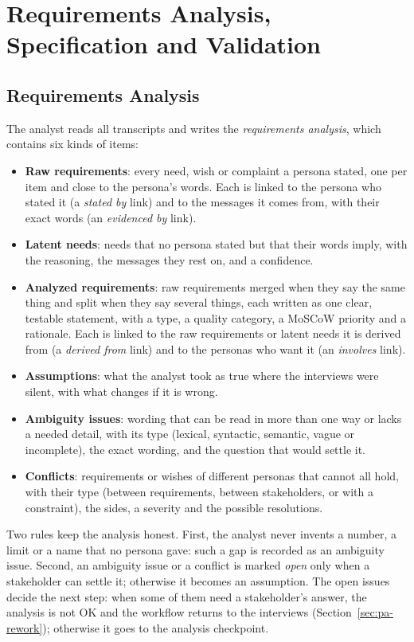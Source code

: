 \section{Requirements Analysis, Specification and Validation}
\label{sec:pa-analysis}

\subsection{Requirements Analysis}
\label{sec:pa-analyst}

The analyst reads all transcripts and writes the \emph{requirements analysis}, which contains six kinds of items:
\begin{itemize}
    \item \textbf{Raw requirements}: every need, wish or complaint a persona stated, one per item and close to the persona's words. Each is linked to the persona who stated it (a \emph{stated by} link) and to the messages it comes from, with their exact words (an \emph{evidenced by} link).
    \item \textbf{Latent needs}: needs that no persona stated but that their words imply, with the reasoning, the messages they rest on, and a confidence.
    \item \textbf{Analyzed requirements}: raw requirements merged when they say the same thing and split when they say several things, each written as one clear, testable statement, with a type, a quality category, a MoSCoW priority and a rationale. Each is linked to the raw requirements or latent needs it is derived from (a \emph{derived from} link) and to the personas who want it (an \emph{involves} link).
    \item \textbf{Assumptions}: what the analyst took as true where the interviews were silent, with what changes if it is wrong.
    \item \textbf{Ambiguity issues}: wording that can be read in more than one way or lacks a needed detail, with its type (lexical, syntactic, semantic, vague or incomplete), the exact wording, and the question that would settle it.
    \item \textbf{Conflicts}: requirements or wishes of different personas that cannot all hold, with their type (between requirements, between stakeholders, or with a constraint), the sides, a severity and the possible resolutions.
\end{itemize}

Two rules keep the analysis honest. First, the analyst never invents a number, a limit or a name that no persona gave: such a gap is recorded as an ambiguity issue. Second, an ambiguity issue or a conflict is marked \emph{open} only when a stakeholder can settle it; otherwise it becomes an assumption. The open issues decide the next step: when some of them need a stakeholder's answer, the analysis is not OK and the workflow returns to the interviews (Section~\ref{sec:pa-rework}); otherwise it goes to the analysis checkpoint.

